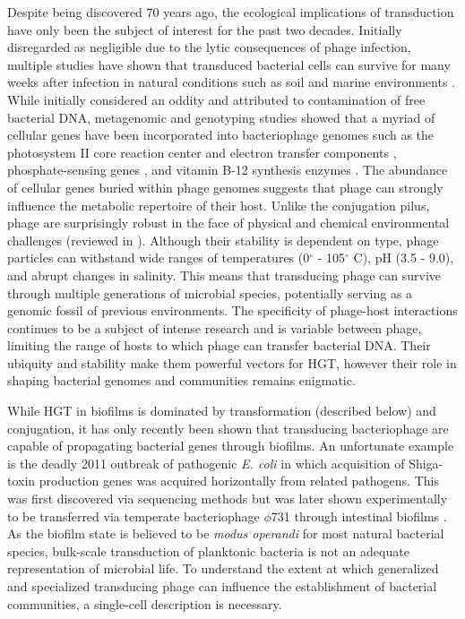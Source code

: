 Despite being discovered 70 years ago, the ecological implications of
transduction have only been the subject of interest for the past two decades.
Initially disregarded as negligible due to the lytic consequences of phage
infection, multiple studies have shown that transduced bacterial cells can
survive for many weeks after infection in natural conditions such as soil
and marine environments \cite{Zeph:1988up, Jiang:1998ul}. While initially
considered an oddity and attributed to contamination of free bacterial DNA,
metagenomic and genotyping studies showed that a myriad of cellular genes have
been incorporated into bacteriophage genomes \cite{Comeau:2008jo} such as the
photosystem II core reaction center and electron transfer components
\cite{lindell:2004vg}, phosphate-sensing genes \cite{Miller:2003hf}, and vitamin
B-12 synthesis enzymes \cite{Williamson:2008fc}. The abundance of cellular
genes buried within phage genomes suggests that phage can strongly 
influence the metabolic repertoire of their host. Unlike the conjugation pilus, phage
are surprisingly robust in the face of physical and chemical environmental
challenges (reviewed in \cite{Jonczyk:2011db}). Although their stability is
dependent on type, phage particles can withstand wide ranges of temperatures
(0$^\circ$ - 105$^\circ$ C), pH (3.5 - 9.0), and abrupt changes in salinity.
This means that transducing phage can survive through multiple generations of
microbial species, potentially serving as a genomic fossil of previous
environments. The specificity of phage-host interactions continues to be a
subject of intense research \cite{ChibaniChennoufi:2004gv} and is variable
between phage, limiting the range of hosts to which phage can transfer bacterial
DNA. Their ubiquity and stability make them powerful vectors for HGT, however
their role in shaping bacterial genomes and communities remains enigmatic. 

While HGT in biofilms is dominated by transformation (described below) and
conjugation, it has only recently been shown that 
transducing bacteriophage are capable of propagating bacterial genes through
biofilms. An unfortunate example is the deadly 2011 outbreak of pathogenic
\textit{E. coli} in which acquisition of Shiga-toxin production genes was
acquired horizontally from related pathogens. This was first discovered via
sequencing methods \cite{Rasko:2011bf} but was later shown experimentally to be
transferred via temperate bacteriophage $\phi$731 through intestinal biofilms
\cite{Solheim:2013bi}. As the biofilm state is believed to be \textit{modus
operandi} for most natural bacterial species, bulk-scale transduction of
planktonic bacteria is not an adequate representation of microbial life. To
understand the extent at which generalized and specialized transducing phage can
influence the establishment of bacterial communities, a single-cell description
is necessary.


